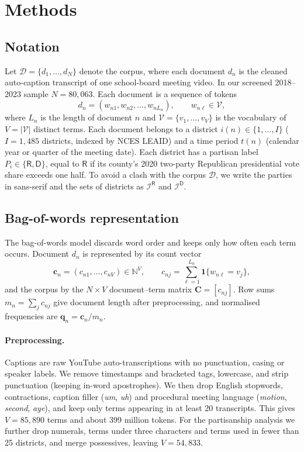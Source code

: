 
\section{Methods}

\subsection{Notation}

Let $\mathcal{D} = \{d_1, \dots, d_N\}$ denote the corpus, where each document $d_n$ is the
cleaned auto-caption transcript of one school-board meeting video. In our screened 2018--2023
sample $N = 80{,}063$. Each document is a sequence of tokens
\[
  d_n = (w_{n1}, w_{n2}, \dots, w_{n L_n}), \qquad w_{n\ell} \in \mathcal{V},
\]
where $L_n$ is the length of document $n$ and $\mathcal{V} = \{v_1, \dots, v_V\}$ is the
vocabulary of $V = |\mathcal{V}|$ distinct terms. Each document belongs to a district
$i(n) \in \{1, \dots, I\}$ ($I = 1{,}485$ districts, indexed by NCES LEAID) and a time period
$t(n)$ (calendar year or quarter of the meeting date). Each district has a partisan label
$P_i \in \{\mathsf{R}, \mathsf{D}\}$, equal to $\mathsf{R}$ if its county's 2020 two-party
Republican presidential vote share exceeds one half. To avoid a clash with the corpus
$\mathcal{D}$, we write the parties in sans-serif and the sets of districts as
$\mathcal{I}^{\mathsf{R}}$ and $\mathcal{I}^{\mathsf{D}}$.

\subsection{Bag-of-words representation}

The bag-of-words model discards word order and keeps only how often each term occurs.
Document $d_n$ is represented by its count vector
\[
  \mathbf{c}_n = (c_{n1}, \dots, c_{nV}) \in \mathbb{N}^{V}, \qquad
  c_{nj} = \sum_{\ell=1}^{L_n} \mathbf{1}\{w_{n\ell} = v_j\},
\]
and the corpus by the $N \times V$ document--term matrix $\mathbf{C} = [c_{nj}]$. Row sums
$m_n = \sum_j c_{nj}$ give document length after preprocessing, and normalised frequencies are
$\mathbf{q}_n = \mathbf{c}_n / m_n$.

\paragraph{Preprocessing.} Captions are raw YouTube auto-transcriptions with no punctuation,
casing or speaker labels. We remove timestamps and bracketed tags, lowercase, and strip
punctuation (keeping in-word apostrophes). We then drop English stopwords, contractions,
caption filler (\emph{um}, \emph{uh}) and procedural meeting language (\emph{motion},
\emph{second}, \emph{aye}), and keep only terms appearing in at least 20 transcripts. This gives
$V = 85{,}890$ terms and about 399 million tokens. For the partisanship analysis we further drop
numerals, terms under three characters and terms used in fewer than 25 districts, and merge
possessives, leaving $V = 54{,}833$.


